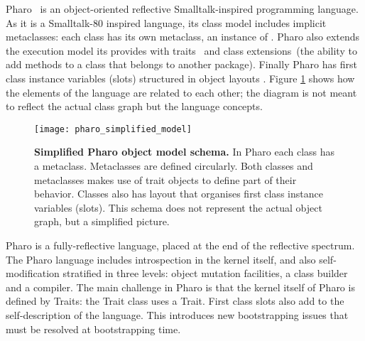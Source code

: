 Pharo~\cite{Blac09a} is an object-oriented reflective Smalltalk-inspired programming language. As it is a Smalltalk-80 inspired language, its class model includes implicit metaclasses: each class has its own metaclass, an instance of . Pharo also extends the execution model its \VM provides with traits~\cite{Scha03a} and class extensions~(\ie the ability to add methods to a class that belongs to another package). Finally Pharo has first class instance variables (slots) structured in object layouts \cite{Verw11a}. Figure \ref{fig:pharo_simplified_model} shows how the elements of the language are related to each other; the diagram is not meant to reflect the actual class graph but the language concepts.

\begin{figure}[ht]
\center
\texttt{[image: pharo\_simplified\_model]}
\caption{\textbf{Simplified Pharo object model schema.} In Pharo each class has a metaclass. Metaclasses are defined circularly. Both classes and metaclasses makes use of trait objects to define part of their behavior. Classes also has layout that organises first class instance variables (slots). This schema does not represent the actual object graph, but a simplified picture.\label{fig:pharo_simplified_model}}
\end{figure}

Pharo is a fully-reflective language, placed at the end of the reflective spectrum. The Pharo language includes introspection in the kernel itself, and also self-modification stratified in three levels: object mutation facilities, a class builder and a compiler. The main challenge in Pharo is that the kernel itself of Pharo is defined by Traits: \eg the Trait class uses a Trait. First class slots also add to the self-description of the language. This introduces new bootstrapping issues that must be resolved at bootstrapping time.



